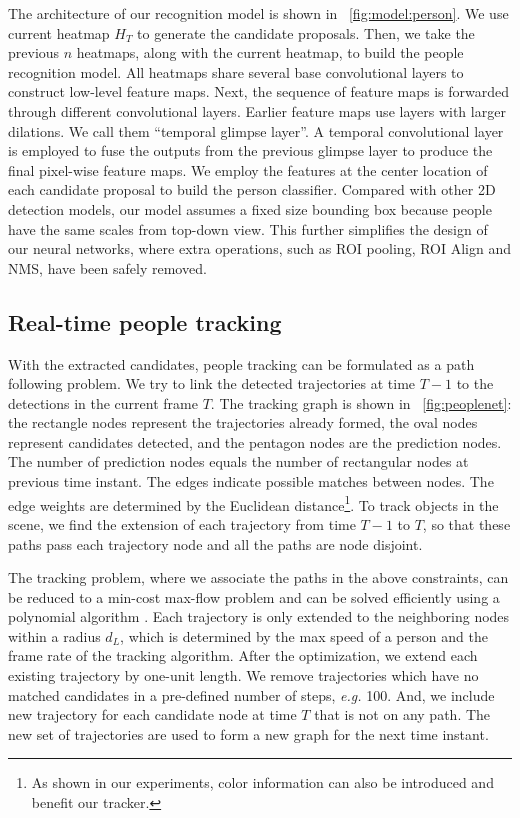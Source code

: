 \documentclass{article}
\begin{document}
The architecture of our recognition model is shown in \figurename~\ref{fig:model:person}. We use current heatmap $H_T$ to generate the candidate proposals.
Then, we take the previous $n$ heatmaps, along with the current heatmap, to build the people recognition model. All heatmaps share several base convolutional
layers to construct low-level feature maps. Next, the sequence of feature maps is forwarded through different convolutional layers.
Earlier feature maps use layers with larger dilations. We call them ``temporal glimpse layer''.
A temporal convolutional layer~\cite{bai2018empirical} is employed to fuse the outputs from the previous glimpse layer to produce the final pixel-wise feature maps.
We employ the features at the center location of each candidate proposal to build the person classifier. Compared with other 2D detection models,
our model assumes a fixed size bounding box because people have the same scales from top-down view. This further simplifies the design of our neural networks,
where extra operations, such as ROI pooling, ROI Align and NMS, have been safely removed.
\subsection{Real-time people tracking}
With the extracted candidates, people tracking can be formulated as a path following problem.
We try to link the detected trajectories at time $T-1$ to the detections in the current frame $T$.
The tracking graph is shown in \figurename{~\ref{fig:peoplenet}}: the rectangle nodes represent
the trajectories already formed, the oval nodes represent candidates detected, and the pentagon nodes are the prediction nodes. The number of prediction nodes
equals the number of rectangular nodes at previous time instant. 
The edges indicate possible matches between nodes.
The edge weights are determined by the Euclidean distance\footnote{As shown in our experiments, color information can also be introduced and benefit our tracker.}.
To track objects in the scene, we find the extension of each trajectory from time $T-1$ to
$T$, so that these paths pass each trajectory node and all the paths are node disjoint.

The tracking problem, where we associate the paths in the above constraints, can be reduced to a
min-cost max-flow problem
and
can be solved efficiently using a polynomial algorithm \cite{papadimitrou1982combinatorial}.
Each trajectory is only extended to the
neighboring nodes within a radius $d_L$, which is determined by the max speed
of a person and the frame rate of the tracking algorithm.
After the optimization, we extend each existing trajectory by one-unit length. We remove
trajectories which have no matched candidates in a pre-defined number of steps, \textit{e.g.} 100. 
 And, we include new trajectory for each
candidate node at time $T$ that is not on any path. The new set of trajectories are used to form
a new graph for the next time instant.
\end{document}

